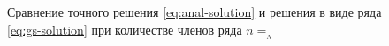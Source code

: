 
\begin{figure}[htb]
  \centering
  \caption{Сравнение точного решения \eqref{eq:anal-solution} и
    решения в виде ряда \eqref{eq:gs-solution} при количестве членов
    ряда $n=__N$}
  \label{fig:series-plot}
\end{figure}
